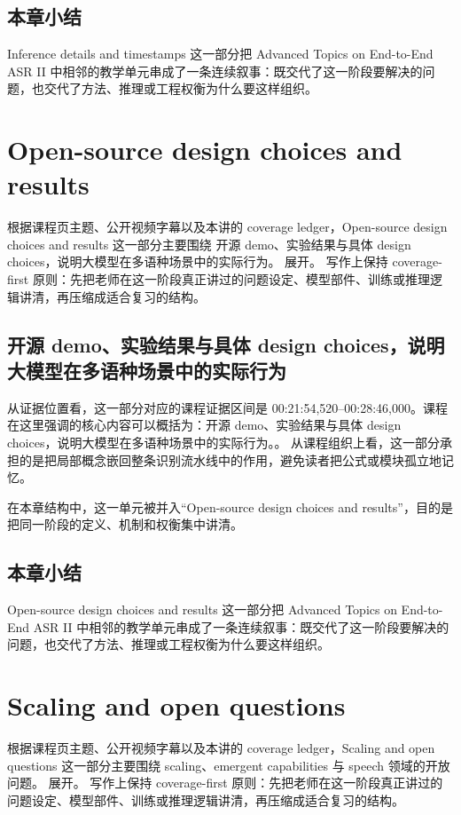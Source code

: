 \documentclass[a4paper]{article}
\begin{document}
\subsection{本章小结}
Inference details and timestamps 这一部分把 Advanced Topics on End-to-End ASR II 中相邻的教学单元串成了一条连续叙事：既交代了这一阶段要解决的问题，也交代了方法、推理或工程权衡为什么要这样组织。

\section{Open-source design choices and results}
根据课程页主题、公开视频字幕以及本讲的 coverage ledger，Open-source design choices and results 这一部分主要围绕 开源 demo、实验结果与具体 design choices，说明大模型在多语种场景中的实际行为。 展开。
写作上保持 coverage-first 原则：先把老师在这一阶段真正讲过的问题设定、模型部件、训练或推理逻辑讲清，再压缩成适合复习的结构。

\subsection{开源 demo、实验结果与具体 design choices，说明大模型在多语种场景中的实际行为}
从证据位置看，这一部分对应的课程证据区间是 00:21:54,520--00:28:46,000。课程在这里强调的核心内容可以概括为：开源 demo、实验结果与具体 design choices，说明大模型在多语种场景中的实际行为。。
从课程组织上看，这一部分承担的是把局部概念嵌回整条识别流水线中的作用，避免读者把公式或模块孤立地记忆。

在本章结构中，这一单元被并入“Open-source design choices and results”，目的是把同一阶段的定义、机制和权衡集中讲清。

\subsection{本章小结}
Open-source design choices and results 这一部分把 Advanced Topics on End-to-End ASR II 中相邻的教学单元串成了一条连续叙事：既交代了这一阶段要解决的问题，也交代了方法、推理或工程权衡为什么要这样组织。

\section{Scaling and open questions}
根据课程页主题、公开视频字幕以及本讲的 coverage ledger，Scaling and open questions 这一部分主要围绕 scaling、emergent capabilities 与 speech 领域的开放问题。 展开。
写作上保持 coverage-first 原则：先把老师在这一阶段真正讲过的问题设定、模型部件、训练或推理逻辑讲清，再压缩成适合复习的结构。
\end{document}
